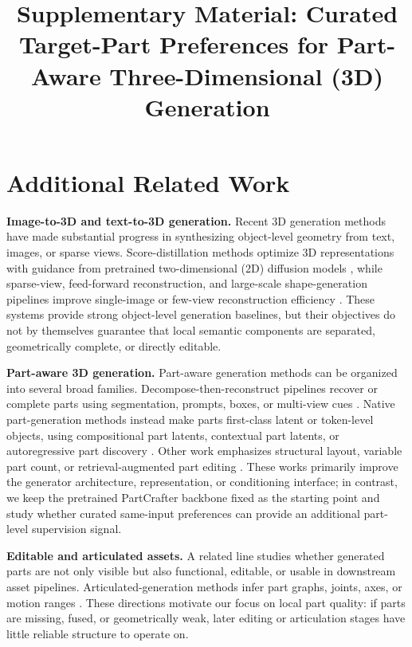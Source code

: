 \documentclass[10pt,twocolumn,letterpaper]{article}
\title{Supplementary Material: Curated Target-Part Preferences for Part-Aware Three-Dimensional (3D) Generation}
\author{}
\begin{document}
\maketitle

\section{Additional Related Work}
\noindent\textbf{Image-to-3D and text-to-3D generation.}
Recent 3D generation methods have made substantial progress in synthesizing object-level geometry from text, images, or sparse views. Score-distillation methods optimize 3D representations with guidance from pretrained two-dimensional (2D) diffusion models \cite{poole2022dreamfusion,lin2023magic3d}, while sparse-view, feed-forward reconstruction, and large-scale shape-generation pipelines improve single-image or few-view reconstruction efficiency \cite{liu2023zero1to3,hong2023lrm,li2025triposg}. These systems provide strong object-level generation baselines, but their objectives do not by themselves guarantee that local semantic components are separated, geometrically complete, or directly editable.

\noindent\textbf{Part-aware 3D generation.}
Part-aware generation methods can be organized into several broad families. Decompose-then-reconstruct pipelines recover or complete parts using segmentation, prompts, boxes, or multi-view cues \cite{chen2025partgen}. Native part-generation methods instead make parts first-class latent or token-level objects, using compositional part latents, contextual part latents, or autoregressive part discovery \cite{lin2025partcrafter,dong2025from,chen2025autopartgen}. Other work emphasizes structural layout, variable part count, or retrieval-augmented part editing \cite{yang2025omnipart,tang2025efficient,li2026partrag}. These works primarily improve the generator architecture, representation, or conditioning interface; in contrast, we keep the pretrained PartCrafter backbone fixed as the starting point and study whether curated same-input preferences can provide an additional part-level supervision signal.

\noindent\textbf{Editable and articulated assets.}
A related line studies whether generated parts are not only visible but also functional, editable, or usable in downstream asset pipelines. Articulated-generation methods infer part graphs, joints, axes, or motion ranges \cite{liu2024singapo,liu2026pact}. These directions motivate our focus on local part quality: if parts are missing, fused, or geometrically weak, later editing or articulation stages have little reliable structure to operate on.
\end{document}

